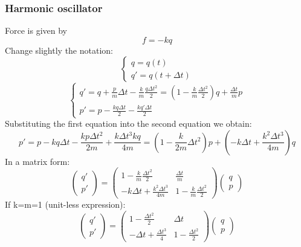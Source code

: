 \subsubsection{Harmonic oscillator}
Force is given by 
\begin{equation*}
    f=- k q
\end{equation*}
Change slightly the notation:
\begin{equation*}
    \begin{cases}
        q=q(t)\\
        q'=q(t+\Delta t)
    \end{cases}
\end{equation*}
\begin{equation*}
    \begin{cases}
        q'=q+\frac{p}{m}\Delta t -\frac{k}{m}\frac{q \Delta t^2}{2}=(1-\frac{k}{m}\frac{\Delta t^2}{2})q+\frac{\Delta t}{m}p\\
        p'=p-\frac{k q \Delta t}{2}-\frac{k q' \Delta t}{2}
    \end{cases}
\end{equation*}
Substituting the first equation into the second equation we obtain:
\begin{equation}
    p'=p-k q \Delta t-\frac{k p \Delta t^2}{2m}+\frac{k \Delta t^3 k q}{4 m} = (1-\frac{k}{2m}\Delta t^2)p+(-k \Delta t+\frac{k^2 \Delta t^3}{4 m})q
\end{equation}
In a matrix form:\\
\begin{equation}
  \begin{pmatrix}
    q'\\
    p'
  \end{pmatrix}
  =
  \begin{pmatrix}
    1-\frac{k}{m}\frac{\Delta t^2}{2} & \frac{\Delta t}{m} \\
    -k \Delta t+\frac{k^2 \Delta t^3}{4 m} & 1-\frac{k}{m}\frac{\Delta t^2}{2}
  \end{pmatrix} 
  \begin{pmatrix}
    q \\
    p
  \end{pmatrix}
\end{equation}
  If k=m=1 (unit-less expression):
\begin{equation}
  \begin{pmatrix}
    q'\\
    p'
  \end{pmatrix}
  =
  \begin{pmatrix}
    1-\frac{\Delta t^2}{2} & \Delta t \\
    -\Delta t+\frac{\Delta t^3}{4} & 1-\frac{\Delta t^2}{2}
  \end{pmatrix} 
  \begin{pmatrix}
    q \\
    p
  \end{pmatrix}
\end{equation}
